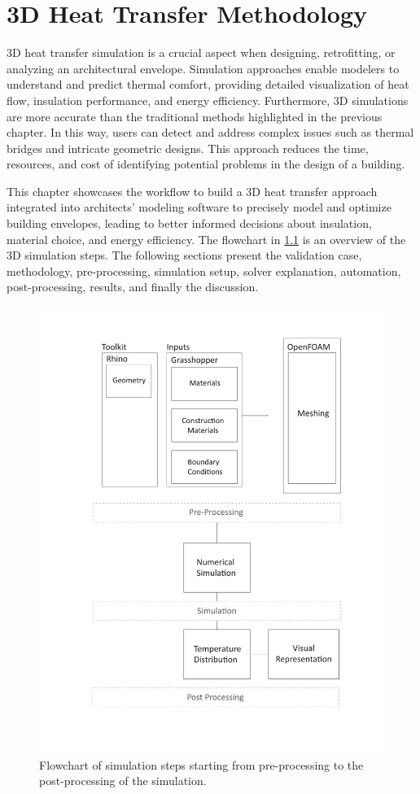 
\chapter{3D Heat Transfer Methodology}

3D heat transfer simulation is a crucial aspect when designing, retrofitting, or analyzing an architectural envelope.
Simulation approaches enable modelers to understand and predict thermal comfort, providing detailed visualization of heat flow, insulation performance, and energy efficiency. 
Furthermore, 3D simulations are more accurate than the traditional methods highlighted in the previous chapter. 
In this way, users can detect and address complex issues such as thermal bridges and intricate geometric designs. 
This approach reduces the time, resources, and cost of identifying potential problems in the design of a building. 
 
This chapter showcases the workflow to build a 3D heat transfer approach integrated into architects' modeling software to precisely model and optimize building envelopes, leading to better informed decisions about insulation, material choice, and energy efficiency. The flowchart in \ref{fig:flowchart} is an overview of the 3D simulation steps. The following sections present the validation case, methodology, pre-processing, simulation setup, solver explanation, automation, post-processing, results, and finally the discussion. 






   
\begin{figure}[h!]
     \centering
    \includegraphics[trim=2.7cm 1.7cm 2.7cm 1.5cm, clip, width=0.7\linewidth]{Figures/flowchartv.pdf}
     \caption[Simulation Flowchart]{Flowchart of simulation steps starting from pre-processing to the post-processing of the simulation.}
   \label{fig:flowchart}
 \end{figure}



